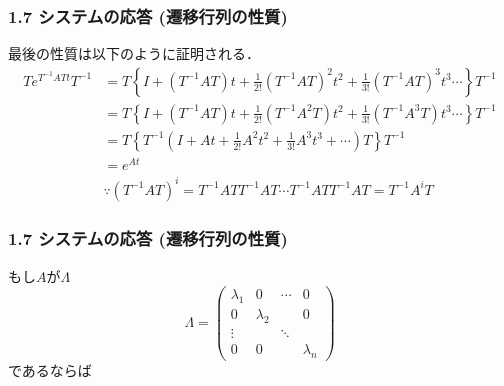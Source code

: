 \begin{frame}[t]
\frametitle{1.7 システムの応答 (遷移行列の性質)}
最後の性質は以下のように証明される．
\begin{align}
 Te^{T^{-1}ATt}T^{-1}
 &= T\left\{
 I + (T^{-1}AT)t + \frac{1}{2!}(T^{-1}AT)^2t^2 +
 \frac{1}{3!}(T^{-1}AT)^3t^3 \cdots \right\}T^{-1}
\nonumber \\
 &= T\left\{
 I + (T^{-1}AT)t + \frac{1}{2!}(T^{-1}A^2T)t^2 +
 \frac{1}{3!}(T^{-1}A^3T)t^3 \cdots \right\}T^{-1}
\nonumber \\
 &= T\left\{
 T^{-1}\left(I + At + \frac{1}{2!}A^2t^2 +
 \frac{1}{3!}A^3t^3 + \cdots\right)T \right\}T^{-1}
\nonumber \\
 &= e^{At}
\\
 & \hspace{0cm}
 \because
 (T^{-1}AT)^i = T^{-1}ATT^{-1}AT\cdots T^{-1}ATT^{-1}AT = T^{-1}A^iT
\end{align}
\end{frame}


\begin{frame}[t]
\frametitle{1.7 システムの応答 (遷移行列の性質)}
もし$A$が$\Lambda$
\begin{equation}
 \Lambda =
  \left(\begin{array}{cccc}
         \lambda_1 & 0         & \cdots & 0 \\
   0         & \lambda_2 &        & 0 \\
   \vdots    &           & \ddots & \\
   0         & 0         &        & \lambda_n
  \end{array}\right)
\end{equation}
であるならば
\end{frame}


